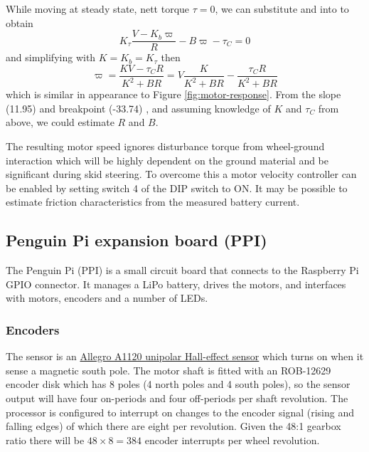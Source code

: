 \documentclass[11pt,fleqn]{article}
\begin{document}
While moving at steady state, nett torque $\tau = 0$, we can substitute  and  into  to obtain
\begin{equation*}
K_\tau \frac{V - K_b \varpi}{R} - B\varpi - \tau_C = 0
\end{equation*}
and simplifying with $K = K_b = K_\tau$ then
\begin{equation}
\varpi = \frac{K V - \tau_C R}{K^2 + BR} = V \frac{K}{K^2 + BR} -   \frac{\tau_C R}{K^2 + BR}
\end{equation}
which is similar in appearance to Figure \ref{fig:motor-response}.  From the slope (11.95) and breakpoint (-33.74) , and assuming knowledge of $K$ and $\tau_C$ from above, we could estimate $R$ and $B$.

The resulting motor speed ignores disturbance torque from wheel-ground interaction which will be highly dependent on the ground material and  be significant during skid steering.  To overcome this a motor velocity controller can be enabled by setting switch 4 of the DIP switch to ON.
It may be possible to estimate  friction characteristics from the measured battery current.

\subsection{Penguin Pi expansion board (PPI)}
The Penguin Pi (PPI) is a small circuit board that connects to the Raspberry Pi GPIO connector.  
It manages a LiPo battery, drives the motors, and interfaces with motors, encoders and a number of LEDs.

\subsubsection{Encoders}

The sensor is an \href{https://www.google.com/url?sa=t&rct=j&q=&esrc=s&source=web&cd=2&ved=2ahUKEwie-sPD3pzdAhUPVt8KHQ58Ad0QFjABegQICRAC&url=https%3A%2F%2Fwww.allegromicro.com%2F~%2Fmedia%2FFiles%2FDatasheets%2FA112x-Datasheet.ashx&usg=AOvVaw0f7rcuUrchXBUwaIueUS9B}{Allegro A1120 unipolar Hall-effect sensor} which turns on when it sense a magnetic south pole.
The motor shaft is fitted with an ROB-12629 encoder disk which has 8  poles (4 north poles and 4 south poles), so the sensor output will have four on-periods and four off-periods per shaft revolution.
The processor is configured to interrupt on changes to the encoder signal (rising and falling edges) of which there are
eight per revolution.  Given the 48:1 gearbox ratio there will be $48 \times 8 = 384$ encoder interrupts per wheel revolution.
\end{document}
